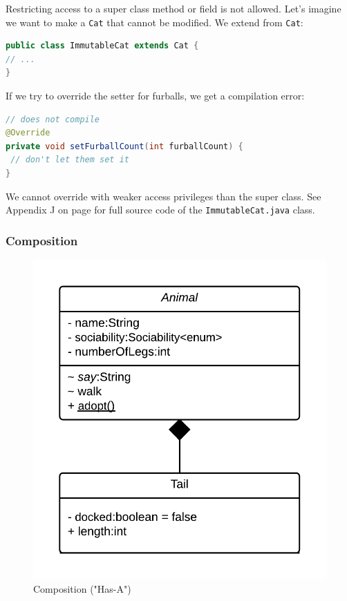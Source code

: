 Restricting access to a super class method or field is not allowed. Let's imagine we want to make a \texttt{Cat} that cannot be modified. We extend from \texttt{Cat}:
\begin{lstlisting}[language=Java]
public class ImmutableCat extends Cat {
// ...
}
\end{lstlisting}

If we try to override the setter for furballs, we get a compilation error:
\begin{lstlisting}[language=Java]
// does not compile
@Override
private void setFurballCount(int furballCount) {
 // don't let them set it
}
\end{lstlisting}

We cannot override with weaker access privileges than the super class. See Appendix J on page \pageref{App:AppendixJ} for full source code of the \texttt{ImmutableCat.java} class.

\subsubsection{Composition}
\begin{figure}[!h]\centering %
\includegraphics[width=0.9\linewidth, frame]{images/composition}
\caption{Composition ("Has-A")}
\label{fig:composition}
\end{figure}

